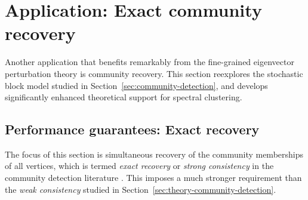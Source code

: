 
\section{Application: Exact community recovery}
\label{sec:community-detection-linf}


Another application that benefits remarkably from the fine-grained eigenvector perturbation theory is community recovery. This section reexplores the stochastic block model studied in Section~\ref{sec:community-detection}, and develops significantly enhanced theoretical support for spectral clustering. 




\subsection{Performance guarantees: Exact recovery}
\label{sec:performance-exact-recovery}


The focus of this section is simultaneous recovery of the community memberships of all vertices, 
which is termed {\em exact recovery} or {\em strong consistency} in the community detection literature \citep{abbe2017community}. This imposes a much stronger requirement than the {\em weak consistency} studied in Section~\ref{sec:theory-community-detection}. 

